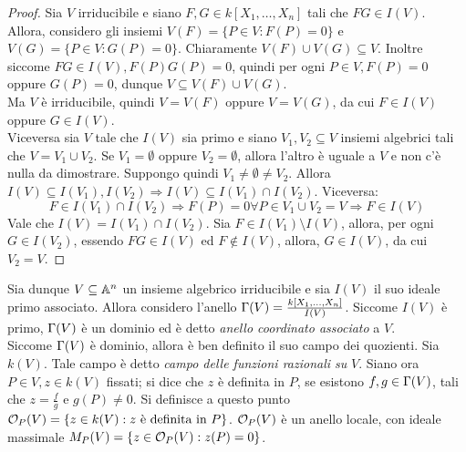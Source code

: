             \begin{proof}
                Sia $V$ irriducibile e siano $F,G \in k[X_1,\ldots,X_n]$ tali che $FG \in I(V)$. Allora, considero gli insiemi $V(F) = \{P \in V : F(P) = 0\}$ e $V(G) = \{
                P \in V : G(P) = 0\}$. Chiaramente $V(F) \cup V(G) \subseteq V$. Inoltre siccome $FG \in I(V), F(P)G(P) = 0$, quindi per ogni $P \in V, F(P) = 0$ oppure $G(P)
                = 0$, dunque $V \subseteq V(F) \cup V(G)$. \\
                Ma $V$ è irriducibile, quindi $V = V(F)$ oppure $V = V(G)$, da cui $F \in I(V)$ oppure $G \in I(V)$. \\
                Viceversa sia $V$ tale che $I(V)$ sia primo e siano $V_1,V_2 \subseteq V$ insiemi algebrici tali che $V = V_1 \cup V_2$. Se $V_1 = \emptyset$ oppure $V_2 = 
                \emptyset$, allora l'altro è uguale a $V$ e non c'è nulla da dimostrare. Suppongo quindi $V_1 \neq \emptyset \neq V_2$. Allora $I(V) \subseteq I(V_1),I(V_2)
                \Longrightarrow I(V) \subseteq I(V_1) \cap I(V_2)$. Viceversa: \begin{equation*}
                    F \in I(V_1) \cap I(V_2) \Longrightarrow F(P) = 0 \forall P \in V_1 \cup V_2 = V \Longrightarrow F \in I(V)
                \end{equation*}
                Vale che $I(V) = I(V_1) \cap I(V_2)$. Sia $F \in I(V_1) \setminus I(V)$, allora, per ogni $G \in I(V_2)$, essendo $FG \in I(V)$ ed $F \notin I(V)$, allora, 
                $G \in I(V)$, da cui $V_2 = V$.  
            \end{proof}
            Sia dunque $V \subseteq \mathbb{A}^n$ un insieme algebrico irriducibile e sia $I(V)$ il suo ideale primo associato. Allora considero l'anello $\Gamma(V) = 
            \frac{k[X_1,\ldots,X_n]}{I(V)}$. Siccome $I(V)$ è primo, $\Gamma(V)$ è un dominio ed è detto \emph{anello coordinato associato} a $V$.\\
            Siccome $\Gamma(V)$ è dominio, allora è ben definito il suo campo dei quozienti. Sia $k(V)$. Tale campo è detto \emph{campo delle funzioni razionali su} $V$.
            Siano ora $P \in V, z \in k(V)$ fissati; si dice che $z$ è definita in $P$, se esistono $f,g \in \Gamma(V)$, tali che $z = \frac{f}{g}$ e $g(P) 
            \neq 0$. Si definisce a questo punto $\mathcal{O}_P(V) = \{z \in k(V) : z \text{ è definita in } P\}$. $\mathcal{O}_P(V)$ è un anello locale, con ideale massimale $M_P(V) = \{
            z \in \mathcal{O}_P(V) : z(P) = 0\}$.

